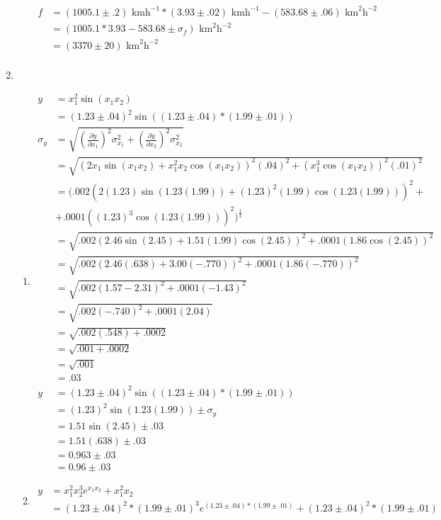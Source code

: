 \documentclass{article}
\begin{document}
\begin{enumerate}
\begin{enumerate}
\begin{align*}
f &= (1005.1 \pm .2)\text{ kmh}^{-1} * (3.93 \pm .02)\text{ kmh}^{-1} - (583.68 \pm .06)\text{ km}^2\text{h}^{-2}\\
&= (1005.1 * 3.93 - 583.68 \pm \sigma_{f})\text{ km}^2\text{h}^{-2}\\
&= (3370 \pm 20)\text{ km}^2\text{h}^{-2}\\
\end{align*}
\end{enumerate}
\item
\begin{enumerate}
\item
\begin{align*}
y &= x_1^2\sin(x_1x_2)\\
&= (1.23 \pm .04)^2\sin((1.23 \pm .04) * (1.99 \pm .01))\\
\sigma_{y} &= \sqrt{(\frac{\partial y}{\partial x_1})^2\sigma_{x_1}^2 + (\frac{\partial y}{\partial x_2})^2\sigma_{x_2}^2}\\
&= \sqrt{(2x_1\sin(x_1x_2) + x_1^2x_2\cos(x_1x_2))^2(.04)^2 + (x_1^3\cos(x_1x_2))^2(.01)^2}\\
&= (.002(2(1.23)\sin(1.23(1.99)) + (1.23)^2(1.99)\cos(1.23(1.99)))^2 +\\
&+ .0001((1.23)^3\cos(1.23(1.99)))^2)^\frac12\\
&= \sqrt{.002(2.46\sin(2.45) + 1.51(1.99)\cos(2.45))^2 + .0001(1.86\cos(2.45))^2}\\
&= \sqrt{.002(2.46(.638) + 3.00(-.770))^2 + .0001(1.86(-.770))^2}\\
&= \sqrt{.002(1.57 - 2.31)^2 + .0001(-1.43)^2}\\
&= \sqrt{.002(-.740)^2 + .0001(2.04)}\\
&= \sqrt{.002(.548) + .0002}\\
&= \sqrt{.001 + .0002}\\
&= \sqrt{.001}\\
&= .03\\
y &= (1.23 \pm .04)^2\sin((1.23 \pm .04) * (1.99 \pm .01))\\
&= (1.23)^2\sin(1.23(1.99)) \pm \sigma_{y}\\
&= 1.51\sin(2.45) \pm .03\\
&= 1.51(.638) \pm .03\\
&= 0.963 \pm .03\\
&= 0.96 \pm .03
\end{align*}
\item
\begin{align*}
y &= x_1^2x_2^3e^{x_1x_2} + x_1^2x_2\\
&= (1.23 \pm .04)^2 * (1.99 \pm .01)^3e^{(1.23 \pm .04) * (1.99 \pm .01)} + (1.23 \pm .04)^2 * (1.99 \pm .01)\\

\end{align*}
\end{enumerate}
\end{enumerate}
\end{document}
